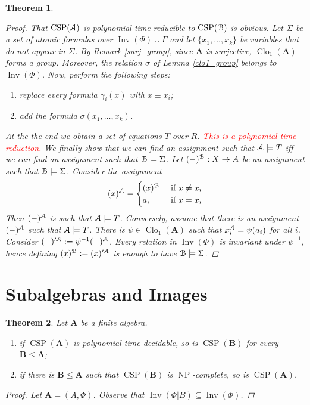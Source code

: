\documentclass{amsart}
\theoremstyle{plain}
\newtheorem{theorem}{Theorem}[section]
\theoremstyle{definition}
\theoremstyle{remark}
\DeclareMathOperator{\Clo}{Clo}
\DeclareMathOperator{\CSP}{CSP}
\DeclareMathOperator{\Inv}{Inv}
\DeclareMathOperator{\NP}{NP}
\begin{document}
\begin{theorem}
\begin{proof}
    That $\CSP(\EuScript{A})$ is polynomial-time reducible to $\CSP(\EuScript{B})$ is obvious.
    Let $\Sigma$ be a set of atomic formulas over $\Inv(\Phi) \cup \Gamma$ and let $\{x_1, \ldots, x_k\}$ be variables that do not appear in $\Sigma$. 
    By Remark \ref{surj_group}, since $\mathbf{A}$ is surjective, $\Clo_1(\mathbf{A})$ forms a group. 
    Moreover, the relation $\sigma$ of Lemma \ref{clo1_group} belongs to $\Inv(\Phi)$. 
    Now, perform the following steps: 
        \begin{enumerate}
            \item replace every formula $\gamma_i(x)$ with $x \equiv x_i$; 
            \item add the formula $\sigma(x_1, \ldots, x_k)$. 
        \end{enumerate}
    At the the end we obtain a set of equations $T$ over $R$. 
    \textcolor{red}{This is a polynomial-time reduction.}
    We finally show that we can find an assignment such that $\EuScript{A} \models T$ iff we can find an assignment such that $\EuScript{B} \models \Sigma$.
    Let $(-)^{\EuScript{B}}: X \to A$ be an assignment such that $\EuScript{B} \models \Sigma$. 
    Consider the assignment 
    \begin{equation*}
        (x)^{\EuScript{A}} = 
        \begin{cases}
            (x)^{\EuScript{B}} & \text{ if } x \neq x_i \\
            a_i & \text{ if } x = x_i 
        \end{cases}
    \end{equation*}
    Then $(-)^\EuScript{A}$ is such that $\EuScript{A} \models T$.  
    Conversely, assume that there is an assignment $(-)^{\EuScript{A}}$ such that $\EuScript{A} \models T$. 
    There is $\psi \in \Clo_1(\mathbf{A})$ such that $x_i^{\EuScript{A}} = \psi(a_i)$ for all $i$. 
    Consider $(-)'^{\EuScript{A}}:=\psi^{-1}(-)^{\EuScript{A}}$. 
    Every relation in $\Inv(\Phi)$ is invariant under $\psi^{-1}$, hence defining $(x)^{\EuScript{B}}:=(x)'^{\EuScript{A}}$ is enough to have $\EuScript{B} \models \Sigma$.  
\end{proof}
\end{theorem}

\section{Subalgebras and Images}
\begin{theorem}
    Let $\mathbf{A}$ be a finite algebra. 
    \begin{enumerate}
        \item if $\CSP(\mathbf{A})$ is polynomial-time decidable, so is $\CSP(\mathbf{B})$ for every $\mathbf{B} \le \mathbf{A}$; 
        \item if there is $\mathbf{B} \le \mathbf{A}$ such that $\CSP(\mathbf{B})$ is $\NP$-complete, so is $\CSP(\mathbf{A})$. 
    \end{enumerate}
    \begin{proof}
        Let $\mathbf{A}=(A, \Phi)$.
        Observe that $\Inv(\Phi|B) \subseteq \Inv(\Phi)$.
    \end{proof}
\end{theorem}
\end{document}

